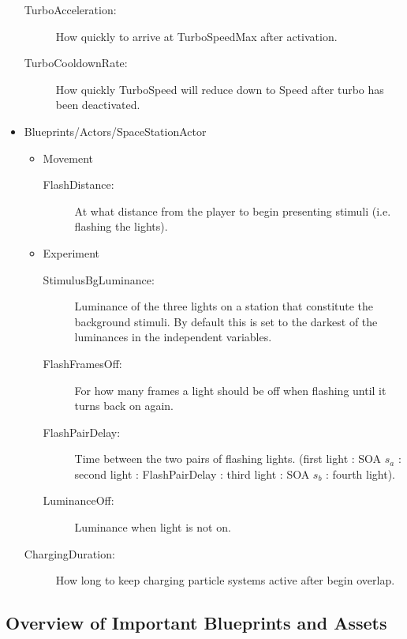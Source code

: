 \documentclass[11pt,a4paper]{article}
\begin{document}
\begin{itemize}
\begin{description}
                    \item[TurboAcceleration:] How quickly to arrive at TurboSpeedMax after activation.
                    \item[TurboCooldownRate:] How quickly TurboSpeed will reduce down to Speed after turbo has been deactivated.
                 \end{description}
                 \item Blueprints/Actors/SpaceStationActor
                 \begin{itemize}
                 	\item Movement
                    \begin{description}
                    	\item[FlashDistance:] At what distance from the player to begin presenting stimuli (i.e. flashing the lights).
                    \end{description}
                    \item Experiment
                    \begin{description}
                    	\item[StimulusBgLuminance:] Luminance of the three lights on a station that constitute the background stimuli. By default this is set to the darkest of the luminances in the independent variables.
                        \item[FlashFramesOff:] For how many frames a light should be off when flashing until it turns back on again.
                        \item[FlashPairDelay:] Time between the two pairs of flashing lights. (first light : SOA $s_a$ : second light : FlashPairDelay : third light : SOA $s_b$ : fourth light).
                        \item[LuminanceOff:] Luminance when light is not on.
                    \end{description}
                 \end{itemize}
                 \begin{description}
                 	\item[ChargingDuration:] How long to keep charging particle systems active after begin overlap.
                 \end{description}
            \end{itemize}
        
        
    \subsection{Overview of Important Blueprints and Assets}
    \label{sec:blueprints}
        
\end{document}
